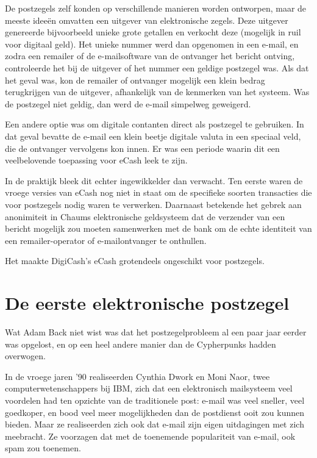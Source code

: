 \documentclass[
  a5paper,
  smalldemyvopaper,11pt,twoside,onecolumn,openright,extrafontsizes,
hidelinks]{memoir}
\begin{document}
De postzegels zelf konden op verschillende manieren worden ontworpen,
maar de meeste ideeën omvatten een uitgever van elektronische zegels.
Deze uitgever genereerde bijvoorbeeld unieke grote getallen en verkocht
deze (mogelijk in ruil voor digitaal geld). Het unieke nummer werd dan
opgenomen in een e-mail, en zodra een remailer of de e-mailsoftware van
de ontvanger het bericht ontving, controleerde het bij de uitgever of
het nummer een geldige postzegel was. Als dat het geval was, kon de
remailer of ontvanger mogelijk een klein bedrag terugkrijgen van de
uitgever, afhankelijk van de kenmerken van het systeem. Was de postzegel
niet geldig, dan werd de e-mail simpelweg geweigerd.

Een andere optie was om digitale contanten direct als postzegel te
gebruiken. In dat geval bevatte de e-mail een klein beetje digitale
valuta in een speciaal veld, die de ontvanger vervolgens kon innen. Er
was een periode waarin dit een veelbelovende toepassing voor eCash leek
te zijn.

In de praktijk bleek dit echter ingewikkelder dan verwacht. Ten eerste
waren de vroege versies van eCash nog niet in staat om de specifieke
soorten transacties die voor postzegels nodig waren te verwerken.
Daarnaast betekende het gebrek aan anonimiteit in Chaums elektronische
geldsysteem dat de verzender van een bericht mogelijk zou moeten
samenwerken met de bank om de echte identiteit van een remailer-operator
of e-mailontvanger te onthullen.

Het maakte DigiCash's eCash grotendeels ongeschikt voor postzegels.

\section{De eerste elektronische
postzegel}\label{de-eerste-elektronische-postzegel}

Wat Adam Back niet wist was dat het postzegelprobleem al een paar jaar
eerder was opgelost, en op een heel andere manier dan de Cypherpunks
hadden overwogen.

In de vroege jaren '90 realiseerden Cynthia Dwork en Moni Naor, twee
computerwetenschappers bij IBM, zich dat een elektronisch mailsysteem
veel voordelen had ten opzichte van de traditionele post: e-mail was
veel sneller, veel goedkoper, en bood veel meer mogelijkheden dan de
postdienst ooit zou kunnen bieden. Maar ze realiseerden zich ook dat
e-mail zijn eigen uitdagingen met zich meebracht. Ze voorzagen dat met
de toenemende populariteit van e-mail, ook spam zou toenemen.
\end{document}
